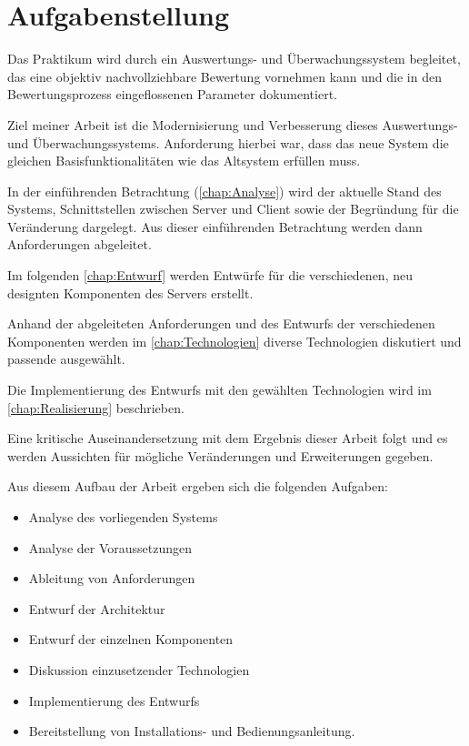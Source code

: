 \section{Aufgabenstellung}
\label{sec:Aufgabenstellung}
Das Praktikum wird durch ein Auswertungs- und Überwachungssystem begleitet, das eine objektiv nachvollziehbare Bewertung vornehmen kann und die in den Bewertungsprozess eingeflossenen Parameter dokumentiert. \cite[S. 2]{sosnaKonzeptionUndRealisierung2010}

Ziel meiner Arbeit ist die Modernisierung und Verbesserung dieses Auswertungs- und Überwachungssystems. Anforderung hierbei war, dass das neue System die gleichen Basisfunktionalitäten wie das Altsystem erfüllen muss.

In der einführenden Betrachtung (\autoref{chap:Analyse}) wird der aktuelle Stand des Systems, Schnittstellen zwischen Server und Client sowie der Begründung für die Veränderung dargelegt. Aus dieser einführenden Betrachtung werden dann Anforderungen abgeleitet.

Im folgenden \autoref{chap:Entwurf} werden Entwürfe für die verschiedenen, neu designten Komponenten des Servers erstellt. 

Anhand der abgeleiteten Anforderungen und des Entwurfs der verschiedenen Komponenten werden im \autoref{chap:Technologien} diverse Technologien diskutiert und passende ausgewählt.

Die Implementierung des Entwurfs mit den gewählten Technologien wird im \autoref{chap:Realisierung} beschrieben.

Eine kritische Auseinandersetzung mit dem Ergebnis dieser Arbeit folgt und es werden Aussichten für mögliche Veränderungen und Erweiterungen gegeben.

Aus diesem Aufbau der Arbeit ergeben sich die folgenden Aufgaben:
\begin{itemize}
	\item Analyse des vorliegenden Systems
	\item Analyse der Voraussetzungen
	\item Ableitung von Anforderungen
	\item Entwurf der Architektur
	\item Entwurf der einzelnen Komponenten
	\item Diskussion einzusetzender Technologien
	\item Implementierung des Entwurfs
	\item Bereitstellung von Installations- und Bedienungsanleitung.
\end{itemize}